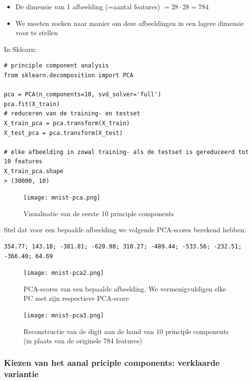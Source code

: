 \documentclass{article}
\begin{document}
\begin{itemize}
    \item De dimensie van 1 afbeelding (=aantal features) $= 28\cdot 28 = 784$
    \item We moeten zoeken naar manier om deze afbeeldingen in een lagere dimensie voor te stellen
\end{itemize}

In Sklearn:

\begin{verbatim}
# principle component analysis
from sklearn.decomposition import PCA

pca = PCA(n_components=10, svd_solver='full')
pca.fit(X_train)
# reduceren van de training- en testset
X_train_pca = pca.transform(X_train)
X_test_pca = pca.transform(X_test)

# elke afbeelding in zowal training- als de testset is gereduceerd tot 10 features
X_train_pca.shape
> (30000, 10)
\end{verbatim}

\begin{figure}[H]
    \centering
    \texttt{[image: mnist-pca.png]}
    \caption{Visualisatie van de eerste 10 principle components}
\end{figure}

Stel dat voor een bepaalde afbeelding we volgende PCA-scores berekend hebben:

\begin{verbatim}
354.77; 143.18; -381.81; -620.98; 310.27; -489.44; -533.56; -232.51; -366.40; 64.69
\end{verbatim}

\begin{figure}[H]
    \centering
    \texttt{[image: mnist-pca2.png]}
    \caption{PCA-scores van een bepaalde afbeelding. We vermenigvuldigen elke PC met zijn respectieve PCA-score}
\end{figure}

\begin{figure}[H]
    \centering
    \texttt{[image: mnist-pca3.png]}
    \caption{Reconstructie van de digit aan de hand van 10 principle components (in plaats van de originele 784 features)}
\end{figure}

\subsubsection{Kiezen van het aanal priciple components: verklaarde variantie}
\end{document}
